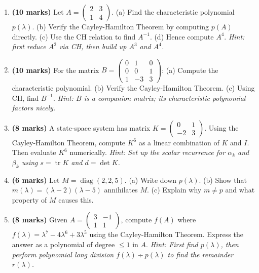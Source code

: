 \documentclass[12pt,a4paper]{article}
\begin{document}
\begin{enumerate}
  \item \textbf{(10 marks)} Let $A = \begin{pmatrix} 2 & 3 \\ 1 & 4 \end{pmatrix}$.
        (a) Find the characteristic polynomial $p(\lambda)$.
        (b) Verify the Cayley-Hamilton Theorem by computing $p(A)$ directly.
        (c) Use the CH relation to find $A^{-1}$.
        (d) Hence compute $A^{4}$.
        \emph{Hint: first reduce $A^{2}$ via CH, then build up $A^{3}$ and $A^{4}$.}

  \item \textbf{(10 marks)} For the matrix $B = \begin{pmatrix}0 & 1 & 0\\0 & 0 & 1\\1 & -3 & 3\end{pmatrix}$:
        (a) Compute the characteristic polynomial.
        (b) Verify the Cayley-Hamilton Theorem.
        (c) Using CH, find $B^{-1}$.
        \emph{Hint: $B$ is a companion matrix; its characteristic polynomial factors nicely.}

  \item \textbf{(8 marks)} A state-space system has matrix $K = \begin{pmatrix} 0 & 1 \\ -2 & 3 \end{pmatrix}$.
        Using the Cayley-Hamilton Theorem, compute $K^{6}$ as a linear combination of $K$ and $I$.
        Then evaluate $K^{6}$ numerically.
        \emph{Hint: Set up the scalar recurrence for $\alpha_k$ and $\beta_k$ using
        $s=\operatorname{tr}K$ and $d=\det K$.}

  \item \textbf{(6 marks)} Let $M = \operatorname{diag}(2, 2, 5)$.
        (a) Write down $p(\lambda)$.
        (b) Show that $m(\lambda) = (\lambda-2)(\lambda-5)$ annihilates $M$.
        (c) Explain why $m \neq p$ and what property of $M$ causes this.

  \item \textbf{(8 marks)} Given $A = \begin{pmatrix} 3 & -1 \\ 1 & 1 \end{pmatrix}$,
        compute $f(A)$ where $f(\lambda) = \lambda^{7} - 4\lambda^{6} + 3\lambda^{5}$
        using the Cayley-Hamilton Theorem.
        Express the answer as a polynomial of degree $\leq 1$ in $A$.
        \emph{Hint: First find $p(\lambda)$, then perform polynomial long division
        $f(\lambda) \div p(\lambda)$ to find the remainder $r(\lambda)$.}
\end{enumerate}
\end{document}
